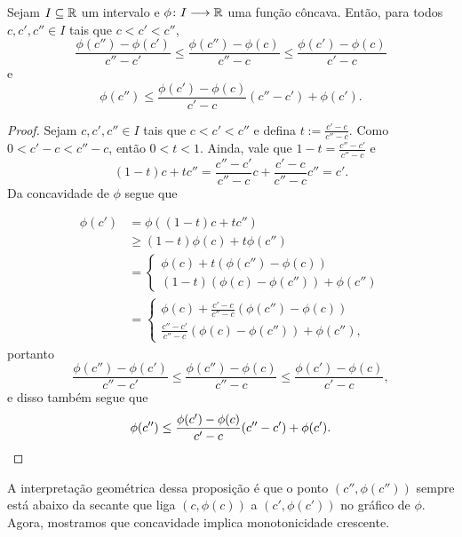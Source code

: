 \begin{lemma}
\label{prop:concavidade.alternativa}
Sejam $I \subseteq \mathbb{R}$ um intervalo e $\phi\colon \allowbreak I \longrightarrow \mathbb{R}$ uma função côncava. Então, para todos $c,c',c'' \in I$ tais que $c<c'<c''$,
	\[
	\frac{\phi(c'') - \phi(c')}{c''-c'} \leq \frac{\phi(c'') - \phi(c)}{c''-c} \leq \frac{\phi(c') - \phi(c)}{c'-c}
	\]
e
	\[
	\phi(c'') \leq \frac{\phi(c') - \phi(c)}{c'-c}(c''-c') + \phi(c').
	\]
\end{lemma}
\begin{proof}
Sejam $c,c',c'' \in I$ tais que $c<c'<c''$ e defina $t:=\frac{c'-c}{c''-c}$. Como $0<c'-c<c''-c$, então $0<t<1$. Ainda, vale que $1-t = \frac{c''-c'}{c''-c}$ e
	\[
	(1-t)c + tc'' = \frac{c''-c'}{c''-c}c + \frac{c'-c}{c''-c}c'' = c'.
	\]
Da concavidade de $\phi$ segue que

	\begin{align*}
	\phi(c') &= \phi((1-t)c + tc'') \\
		&\geq (1-t)\phi(c) + t\phi(c'') \\
		&= 
			\begin{cases}
			\phi(c) + t(\phi(c'')-\phi(c)) \\
			(1-t)(\phi(c)-\phi(c'')) + \phi(c'')
			\end{cases} \\
		&=
			\begin{cases}
			\phi(c) + \frac{c'-c}{c''-c}(\phi(c'')-\phi(c)) \\
			\frac{c''-c'}{c''-c}(\phi(c)-\phi(c'')) + \phi(c''),
			\end{cases}	
	\end{align*}
portanto
	\[
	\frac{\phi(c'') - \phi(c')}{c''-c'} \leq \frac{\phi(c'') - \phi(c)}{c''-c} \leq \frac{\phi(c') - \phi(c)}{c'-c},
	\]
e disso também segue que
	\[
	\phi(c'') \leq \frac{\phi(c') - \phi(c)}{c'-c}(c''-c') + \phi(c').
	\qedhere
	\]
\end{proof}

A interpretação geométrica dessa proposição é que o ponto $(c'',\phi(c''))$ sempre está abaixo da secante que liga $(c,\phi(c))$ a $(c',\phi(c'))$ no gráfico de $\phi$. Agora, mostramos que concavidade implica monotonicidade crescente.

